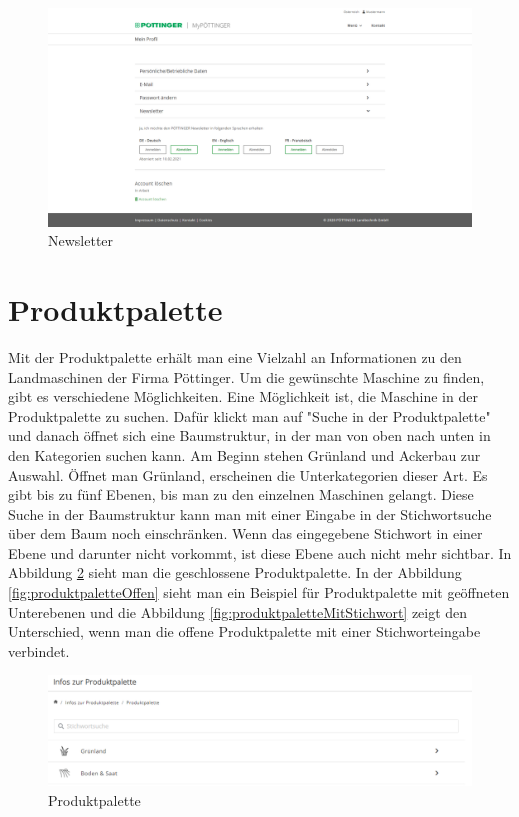 \begin{figure}[H]
	\centerline{
		\includegraphics[width=1\textwidth, frame]{./grafiken/erm_profil_newsletter.png}
	}
	\vskip0pt
	\caption{Newsletter} \label{fig:newsletter}
\end{figure}

\section{Produktpalette}

Mit der Produktpalette erhält man eine Vielzahl an Informationen zu den Landmaschinen der Firma Pöttinger. Um die gewünschte Maschine zu finden, gibt es verschiedene Möglichkeiten. Eine Möglichkeit ist, die Maschine in der Produktpalette zu suchen. Dafür klickt man auf "Suche in der Produktpalette" und danach öffnet sich eine Baumstruktur, in der man von oben nach unten in den Kategorien suchen kann. Am Beginn stehen Grünland und Ackerbau zur Auswahl. Öffnet man Grünland, erscheinen die Unterkategorien dieser Art. Es gibt bis zu fünf Ebenen, bis man zu den einzelnen Maschinen gelangt. Diese Suche in der Baumstruktur kann man mit einer Eingabe in der Stichwortsuche über dem Baum noch einschränken. Wenn das eingegebene Stichwort in einer Ebene und darunter nicht vorkommt, ist diese Ebene auch nicht mehr sichtbar. In Abbildung \ref{fig:produktpalette} sieht man die geschlossene Produktpalette. In der Abbildung \ref{fig:produktpaletteOffen} sieht man ein Beispiel für Produktpalette mit geöffneten Unterebenen und die Abbildung \ref{fig:produktpaletteMitStichwort} zeigt den Unterschied, wenn man die offene Produktpalette mit einer Stichworteingabe verbindet.

\begin{figure}[H]
	\centerline{
		\includegraphics[width=1\textwidth, frame]{./grafiken/erm_produktpalette_neu_.png}
	}
	\vskip0pt
	\caption{Produktpalette} \label{fig:produktpalette}
\end{figure}

